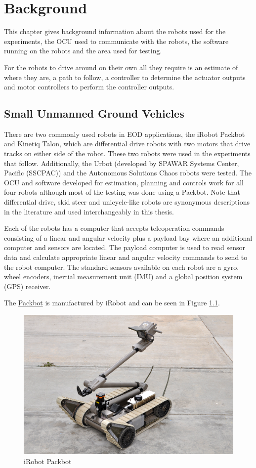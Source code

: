 \chapter{Background}
\label{ch:background}
This chapter gives background information about the robots used for the experiments, the OCU used to communicate with the robots, the software running on the robots and the area used for testing.

For the robots to drive around on their own all they require is an estimate of where they are, a path to follow, a controller to determine the actuator outputs and motor controllers to perform the controller outputs.

\section{Small Unmanned Ground Vehicles}
\label{sec:smallugvs}
There are two commonly used robots in EOD applications, the iRobot Packbot and Kinetiq Talon, which are differential drive robots with two motors that drive tracks on either side of the robot. These two robots were used in the experiments that follow. Additionally, the Urbot (developed by SPAWAR Systems Center, Pacific (SSCPAC)) and the Autonomous Solutions Chaos robots were tested. The OCU and software developed for estimation, planning and controls work for all four robots although most of the testing was done using a Packbot. Note that differential drive, skid steer and unicycle-like robots are synonymous descriptions in the literature and used interchangeably in this thesis.

Each of the robots has a computer that accepts teleoperation commands consisting of a linear and angular velocity plus a payload bay where an additional computer and sensors are located. The payload computer is used to read sensor data and calculate appropriate linear and angular velocity commands to send to the robot computer. The standard sensors available on each robot are a gyro, wheel encoders, inertial measurement unit (IMU) and a global position system (GPS) receiver.

The \href{http://www.irobot.com/sp.cfm?pageid=171}{Packbot} is manufactured by iRobot and can be seen in Figure \ref{fig:packbot}.

\begin{figure}[ht!]
	\centering
	\includegraphics[width=.3\textwidth]{images/packbotRetrotraverse}
	\caption{iRobot Packbot}
	\label{fig:packbot}
\end{figure}

